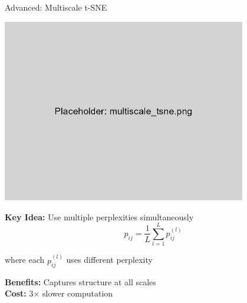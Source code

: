 \documentclass[aspectratio=169]{beamer}
\begin{document}
\begin{frame}{Advanced: Multiscale t-SNE}
\begin{center}
\includegraphics[width=0.8\textwidth]{./Figures/multiscale_tsne.png}
\end{center}

\textbf{Key Idea:} Use multiple perplexities simultaneously
$$p_{ij} = \frac{1}{L}\sum_{l=1}^L p_{ij}^{(l)}$$

where each $p_{ij}^{(l)}$ uses different perplexity

\textbf{Benefits:} Captures structure at all scales\\
\textbf{Cost:} 3× slower computation
\end{frame}
\end{document}
